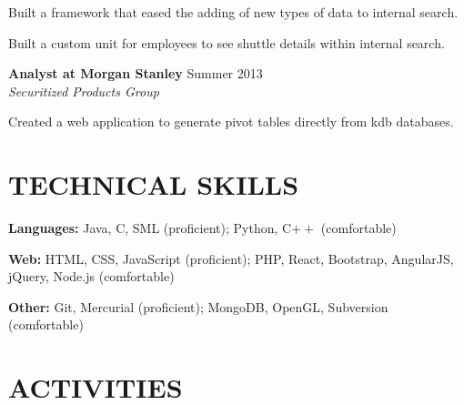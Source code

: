 \documentclass[margin, 11pt]{res} %
\begin{document}
\begin{resume}
\begin{itemize} \itemsep -2pt
{\small
\item Built a framework that eased the adding of new types of data to internal search.
\item Built a custom unit for employees to see shuttle details within internal search.
}
\end{itemize}

\vspace{3pt}

{\bf Analyst at Morgan Stanley} \hfill {\small Summer 2013}\\
{\small {\sl Securitized Products Group}}
\begin{itemize} \itemsep -2pt %
{\small
\item Created a web application to generate pivot tables directly from kdb databases.
}
\end{itemize}


\section{TECHNICAL SKILLS}

{\bf Languages:}
Java, C, SML (proficient); Python, C$++$ (comfortable)

\vspace{5pt}

{\bf Web:}
HTML, CSS, JavaScript (proficient); PHP, React, Bootstrap, AngularJS, jQuery, Node.js (comfortable)

\vspace{5pt}

{\bf Other:}
Git, Mercurial (proficient); MongoDB, OpenGL, Subversion (comfortable)


\section{ACTIVITIES}


\end{resume}
\end{document}
